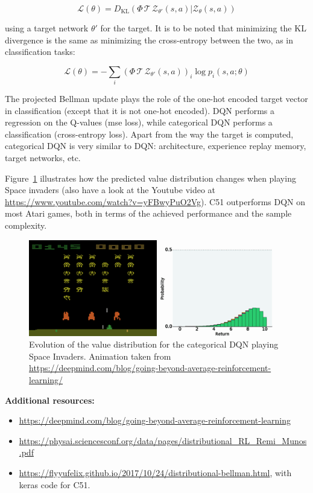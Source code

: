 \documentclass[
  letterpaper,
  DIV=11,
  numbers=noendperiod]{scrreprt}
\providecommand{\tightlist}{%
  \setlength{\itemsep}{0pt}\setlength{\parskip}{0pt}}\usepackage{longtable,booktabs,array}
\begin{document}
\[
    \mathcal{L}(\theta) = D_\text{KL} (\Phi \, \mathcal{T} \, \mathcal{Z}_{\theta'}(s, a) | \mathcal{Z}_\theta(s, a))
\]

using a target network \(\theta'\) for the target. It is to be noted
that minimizing the KL divergence is the same as minimizing the
cross-entropy between the two, as in classification tasks:

\[
    \mathcal{L}(\theta) =  - \sum_i (\Phi \, \mathcal{T} \, \mathcal{Z}_{\theta'}(s, a))_i \log p_i (s, a; \theta)
\]

The projected Bellman update plays the role of the one-hot encoded
target vector in classification (except that it is not one-hot encoded).
DQN performs a regression on the Q-values (mse loss), while categorical
DQN performs a classification (cross-entropy loss). Apart from the way
the target is computed, categorical DQN is very similar to DQN:
architecture, experience replay memory, target networks, etc.

Figure~\ref{fig-categoricaldqn} illustrates how the predicted value
distribution changes when playing Space invaders (also have a look at
the Youtube video at \url{https://www.youtube.com/watch?v=yFBwyPuO2Vg}).
C51 outperforms DQN on most Atari games, both in terms of the achieved
performance and the sample complexity.

\begin{figure}

{\centering \includegraphics[width=1\textwidth,height=\textheight]{./img/categoricaldqn.gif}

}

\caption{\label{fig-categoricaldqn}Evolution of the value distribution
for the categorical DQN playing Space Invaders. Animation taken from
\url{https://deepmind.com/blog/going-beyond-average-reinforcement-learning/}}

\end{figure}

\textbf{Additional resources:}

\begin{itemize}
\tightlist
\item
  \url{https://deepmind.com/blog/going-beyond-average-reinforcement-learning}
\item
  \url{https://physai.sciencesconf.org/data/pages/distributional_RL_Remi_Munos.pdf}
\item
  \url{https://flyyufelix.github.io/2017/10/24/distributional-bellman.html},
  with keras code for C51.
\end{itemize}
\end{document}
